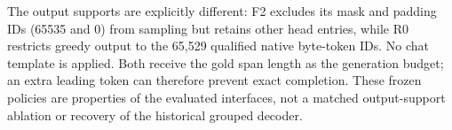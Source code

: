 The output supports are explicitly different: F2 excludes its mask and padding IDs (65535 and 0) from sampling but retains other head entries, while R0 restricts greedy output to the 65,529 qualified native byte-token IDs. No chat template is applied. Both receive the gold span length as the generation budget; an extra leading token can therefore prevent exact completion. These frozen policies are properties of the evaluated interfaces, not a matched output-support ablation or recovery of the historical grouped decoder.
